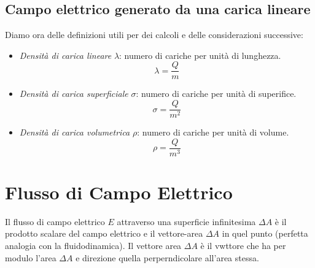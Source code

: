             \subsection{Campo elettrico generato da una carica lineare} Diamo 
            ora delle definizioni utili per dei calcoli e delle considerazioni
            successive:
            \begin{itemize}
                \item \textit{Densità di carica lineare} $\lambda$: numero di 
                cariche per unità di lunghezza.\\
                    \begin{equation}
                        \lambda = \frac{Q}{m}
                    \end{equation}
                \item \textit{Densità di carica superficiale} $\sigma$: numero 
                di cariche per unità di superifice.\\
                    \begin{equation}
                        \sigma = \frac{Q}{m^2}
                    \end{equation}
                \item \textit{Densità di carica volumetrica} $\rho$: numero
                di cariche per unità di volume.\\
                    \begin{equation}
                        \rho = \frac{Q}{m^3}
                    \end{equation}
            \end{itemize}

        \section{Flusso di Campo Elettrico} Il flusso di campo elettrico $E$ 
        attraverso una superficie infinitesima $\Delta A$ è il prodotto scalare
        del campo elettrico e il vettore-area $\Delta A$ in quel punto 
        (perfetta analogia con la fluidodinamica). Il vettore area $\Delta A$ è
        il vwttore che ha per modulo l'area $\Delta A$ e direzione quella 
        perperndicolare all'area stessa.
